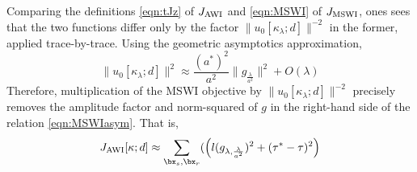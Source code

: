Comparing the definitions \ref{eqn:tJz} of $J_{\rm AWI}$ and
\ref{eqn:MSWI} of $J_{\rm MSWI}$, ones sees
that the two functions differ only by the factor $\|u_0[\kappa_{\lambda};d]\|^{-2}$ in
the former, applied trace-by-trace. Using the geometric asymptotics approximation, 
$$
\|u_0[\kappa_{\lambda};d]\|^2 \approx \frac{(a^*)^2}{a^2}\|g_{\frac{\lambda}{a^2}}\|^2 + O(\lambda)
$$
Therefore, multiplication of the MSWI objective by $\|u_0[\kappa_{\lambda};d]\|^{-2}$
precisely removes the amplitude factor and norm-squared of $g$ in the right-hand side of the
relation \ref{eqn:MSWIasym}. That is,
\begin{equation}
  \label{eqn:preawitt}
J_{\rm AWI}[\kappa;d] \approx \sum_{\bx_s,\bx_r} (\left(l(g_{\lambda,\frac{\lambda}{a^2}})^2  + (\tau^*-\tau)^2\right)
 \end{equation}


